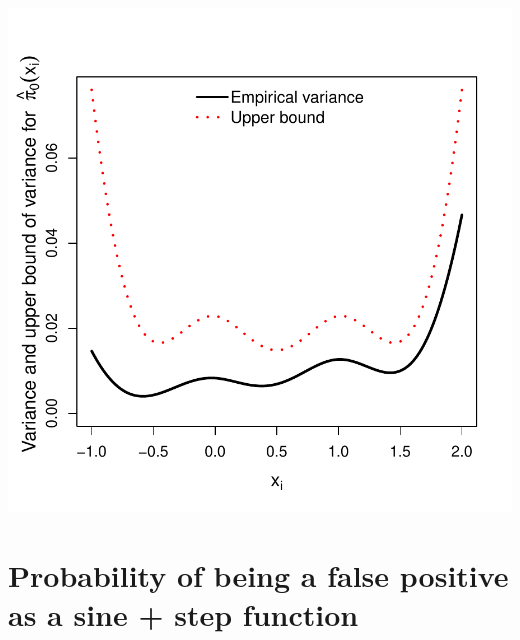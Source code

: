 \documentclass{article}\usepackage[]{graphicx}\usepackage[]{color}
\makeatletter
\def\maxwidth{ %
  \ifdim\Gin@nat@width>\linewidth
    \linewidth
  \else
    \Gin@nat@width
  \fi
}
\newenvironment{knitrout}{}{} %
\makeatother
\begin{document}
\begin{knitrout}
{\centering \includegraphics[width=\maxwidth]{figures/Fig2c-1} 

}



\end{knitrout}

\section{Probability of being a false positive as a sine + step function}
\end{document}
